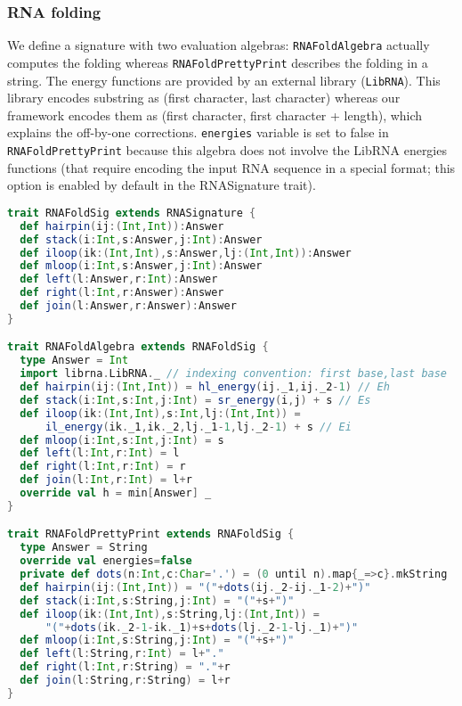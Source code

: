 \newpage
\subsubsection{RNA folding} \label{ex_rnafold}
We define a signature with two evaluation algebras: {\tt RNAFoldAlgebra} actually computes the folding whereas {\tt RNAFoldPrettyPrint} describes the folding in a string. The energy functions are provided by an external library ({\tt LibRNA}). This library encodes substring as (first character, last character) whereas our framework encodes them as (first character, first character + length), which explains the off-by-one corrections. {\tt energies} variable is set to false in {\tt RNAFoldPrettyPrint} because this algebra does not involve the LibRNA energies functions (that require encoding the input RNA sequence in a special format; this option is enabled by default in the RNASignature trait).

\begin{lstlisting}[language=Scala,captionpos=none]
trait RNAFoldSig extends RNASignature {
  def hairpin(ij:(Int,Int)):Answer
  def stack(i:Int,s:Answer,j:Int):Answer
  def iloop(ik:(Int,Int),s:Answer,lj:(Int,Int)):Answer
  def mloop(i:Int,s:Answer,j:Int):Answer
  def left(l:Answer,r:Int):Answer
  def right(l:Int,r:Answer):Answer
  def join(l:Answer,r:Answer):Answer
}

trait RNAFoldAlgebra extends RNAFoldSig {
  type Answer = Int
  import librna.LibRNA._ // indexing convention: first base,last base
  def hairpin(ij:(Int,Int)) = hl_energy(ij._1,ij._2-1) // Eh
  def stack(i:Int,s:Int,j:Int) = sr_energy(i,j) + s // Es
  def iloop(ik:(Int,Int),s:Int,lj:(Int,Int)) =
      il_energy(ik._1,ik._2,lj._1-1,lj._2-1) + s // Ei
  def mloop(i:Int,s:Int,j:Int) = s
  def left(l:Int,r:Int) = l
  def right(l:Int,r:Int) = r
  def join(l:Int,r:Int) = l+r
  override val h = min[Answer] _
}

trait RNAFoldPrettyPrint extends RNAFoldSig {
  type Answer = String
  override val energies=false
  private def dots(n:Int,c:Char='.') = (0 until n).map{_=>c}.mkString
  def hairpin(ij:(Int,Int)) = "("+dots(ij._2-ij._1-2)+")"
  def stack(i:Int,s:String,j:Int) = "("+s+")"
  def iloop(ik:(Int,Int),s:String,lj:(Int,Int)) =
      "("+dots(ik._2-1-ik._1)+s+dots(lj._2-1-lj._1)+")"
  def mloop(i:Int,s:String,j:Int) = "("+s+")"
  def left(l:String,r:Int) = l+"."
  def right(l:Int,r:String) = "."+r
  def join(l:String,r:String) = l+r
}
\end{lstlisting}

